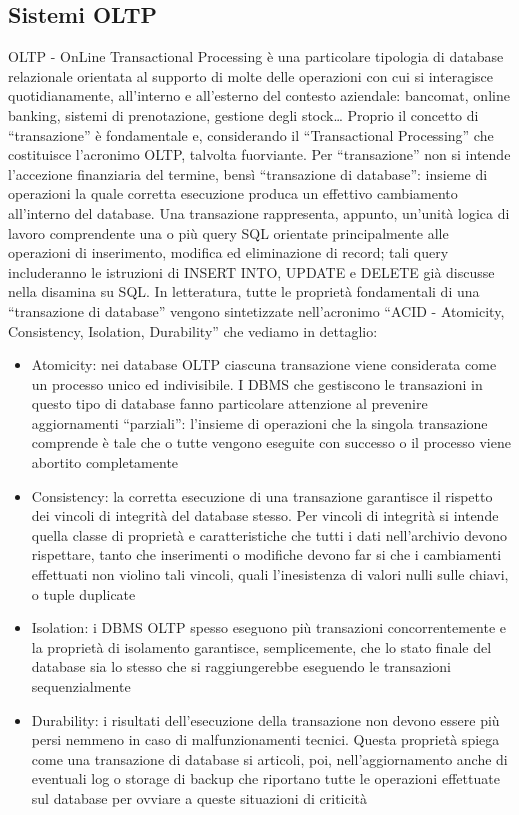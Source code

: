 \documentclass[a4paper,12pt]{report}
\begin{document}
\subsection{Sistemi OLTP}
OLTP - OnLine Transactional Processing è una particolare tipologia di database relazionale orientata al supporto di molte delle operazioni con cui si interagisce quotidianamente, all’interno e all’esterno del contesto aziendale: bancomat, online banking, sistemi di prenotazione, gestione degli stock… Proprio il concetto di “transazione” è fondamentale e, considerando il “Transactional Processing” che costituisce l’acronimo OLTP, talvolta fuorviante. Per “transazione” non si intende l’accezione finanziaria del termine, bensì “transazione di database”: insieme di operazioni la quale corretta esecuzione produca un effettivo cambiamento all’interno del database. Una transazione rappresenta, appunto, un’unità logica di lavoro comprendente una o più query SQL orientate principalmente alle operazioni di inserimento, modifica ed eliminazione di record; tali query includeranno le istruzioni di INSERT INTO, UPDATE e DELETE già discusse nella disamina su SQL. In letteratura, tutte le proprietà fondamentali di una “transazione di database” vengono sintetizzate nell’acronimo “ACID - Atomicity, Consistency, Isolation, Durability” che vediamo in dettaglio:
\begin{itemize}
    \item Atomicity: nei database OLTP ciascuna transazione viene considerata come un processo unico ed indivisibile. I DBMS che gestiscono le transazioni in questo tipo di database fanno particolare attenzione al prevenire aggiornamenti “parziali”: l’insieme di operazioni che la singola transazione comprende è tale che o tutte vengono eseguite con successo o il processo viene abortito completamente
    \item Consistency: la corretta esecuzione di una transazione garantisce il rispetto dei vincoli di integrità del database stesso. Per vincoli di integrità si intende quella classe di proprietà e caratteristiche che tutti i dati nell’archivio devono rispettare, tanto che inserimenti o modifiche devono far si che i cambiamenti effettuati non violino tali vincoli, quali l’inesistenza di valori nulli sulle chiavi, o tuple duplicate
    \item Isolation: i DBMS OLTP spesso eseguono più transazioni concorrentemente e la proprietà di isolamento garantisce, semplicemente, che lo stato finale del database sia lo stesso che si raggiungerebbe eseguendo le transazioni sequenzialmente
    \item Durability: i risultati dell’esecuzione della transazione non devono essere più persi nemmeno in caso di malfunzionamenti tecnici. Questa proprietà spiega come una transazione di database si articoli, poi, nell’aggiornamento anche di eventuali log o storage di backup che riportano tutte le operazioni effettuate sul database per ovviare a queste situazioni di criticità 
\end{itemize}
\end{document}
